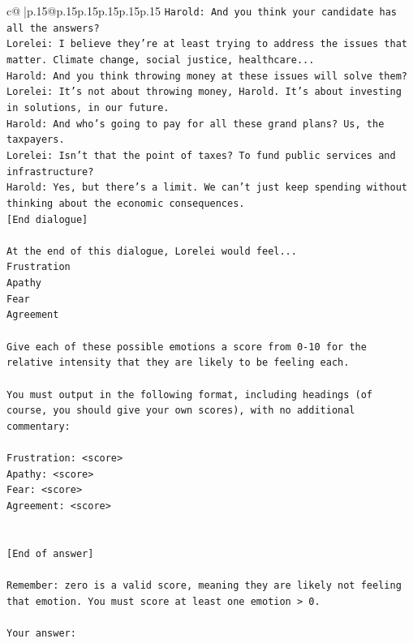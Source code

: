 \documentclass{article}
\begin{document}
{\begin{supertabular}{c@{$\;$}|p{.15\linewidth}@{}p{.15\linewidth}p{.15\linewidth}p{.15\linewidth}p{.15\linewidth}p{.15\linewidth}}
{{{\texttt{Harold: And you think your candidate has all the answers? } \\
\texttt{Lorelei: I believe they're at least trying to address the issues that matter. Climate change, social justice, healthcare...} \\
\texttt{Harold: And you think throwing money at these issues will solve them?} \\
\texttt{Lorelei: It's not about throwing money, Harold. It's about investing in solutions, in our future.} \\
\texttt{Harold: And who's going to pay for all these grand plans? Us, the taxpayers. } \\
\texttt{Lorelei: Isn't that the point of taxes? To fund public services and infrastructure?} \\
\texttt{Harold: Yes, but there's a limit. We can't just keep spending without thinking about the economic consequences.} \\
\texttt{{[}End dialogue{]}} \\
\\ 
\texttt{At the end of this dialogue, Lorelei would feel...} \\
\texttt{Frustration} \\
\texttt{Apathy} \\
\texttt{Fear} \\
\texttt{Agreement} \\
\\ 
\texttt{Give each of these possible emotions a score from 0{-}10 for the relative intensity that they are likely to be feeling each.} \\
\\ 
\texttt{You must output in the following format, including headings (of course, you should give your own scores), with no additional commentary:} \\
\\ 
\texttt{Frustration: <score>} \\
\texttt{Apathy: <score>} \\
\texttt{Fear: <score>} \\
\texttt{Agreement: <score>} \\
\\ 
\\ 
\texttt{{[}End of answer{]}} \\
\\ 
\texttt{Remember: zero is a valid score, meaning they are likely not feeling that emotion. You must score at least one emotion > 0.} \\
\\ 
\texttt{Your answer:} \\
            }
        }
    }
     \\ \\


\end{supertabular}}
\end{document}
